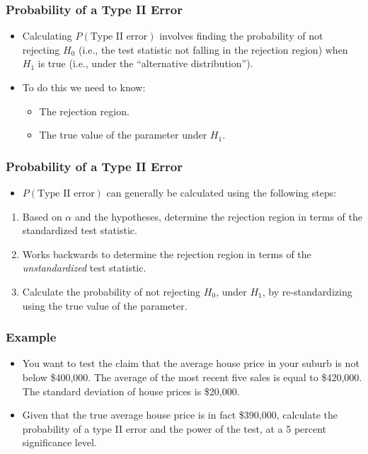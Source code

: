 \documentclass[14pt]{beamer}
\begin{document}
\begin{frame}
	\frametitle{Probability of a Type II Error}
	
	\begin{itemize}[label={\color{blue}$\blacktriangleright$}]
		\item Calculating $P(\text{Type II error})$ involves finding the probability of not rejecting $H_0$ (i.e., the test statistic not falling in the rejection region) when $H_1$ is true (i.e., under the ``alternative distribution'').
		
		\item To do this we need to know:
		\begin{itemize}[label={\color{blue}$\blacktriangleright$}]
			\item The rejection region.
			\item The true value of the parameter under $H_1$.
		\end{itemize}
	\end{itemize}
	
\end{frame}
\begin{frame}
	\frametitle{Probability of a Type II Error}
	
	\begin{itemize}[label={\color{blue}$\blacktriangleright$}]
		\item $P(\text{Type II error})$ can generally be calculated using the following steps:
	\end{itemize}
	
	\begin{enumerate}[label=\textcolor{blue}{\arabic*.}]
		\item Based on $\alpha$ and the hypotheses, determine the rejection region in terms of the standardized test statistic.
		
		\item Works backwards to determine the rejection region in terms of the \emph{unstandardized} test statistic.
		
		\item Calculate the probability of not rejecting $H_0$, under $H_1$, by re-standardizing using the true value of the parameter.
	\end{enumerate}
	
\end{frame}
\begin{frame}
	\frametitle{Example}
	
	\begin{itemize}[label={\color{blue}$\blacktriangleright$}]
		\item You want to test the claim that the average house price in your suburb is not below \$400,000. The average of the most recent five sales is equal to \$420,000. The standard deviation of house prices is \$20,000.
		
		\item Given that the true average house price is in fact \$390,000, calculate the probability of a type II error and the power of the test, at a 5 percent significance level.
	\end{itemize}
	
\end{frame}
\end{document}
